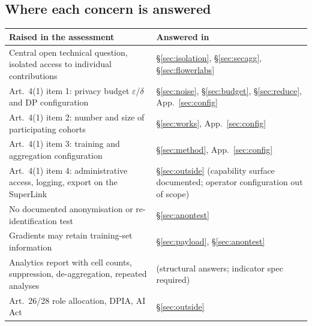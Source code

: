\subsection*{Where each concern is answered}

\begin{longtable}{p{}p{}}
\toprule
\textbf{Raised in the assessment} & \textbf{Answered in} \\
\midrule
\endhead
Central open technical question, isolated access to individual contributions
  & \S\ref{sec:isolation}, \S\ref{sec:secagg}, \S\ref{sec:flowerlabs} \\
Art.~4(1) item 1: privacy budget $\varepsilon$/$\delta$ and DP configuration
  & \S\ref{sec:noise}, \S\ref{sec:budget}, \S\ref{sec:reduce}, App.~\ref{sec:config} \\
Art.~4(1) item 2: number and size of participating cohorts
  & \S\ref{sec:works}, App.~\ref{sec:config} \\
Art.~4(1) item 3: training and aggregation configuration
  & \S\ref{sec:method}, App.~\ref{sec:config} \\
Art.~4(1) item 4: administrative access, logging, export on the SuperLink
  & \S\ref{sec:outside} (capability surface documented; operator configuration out of scope) \\
No documented anonymisation or re-identification test
  & \S\ref{sec:anontest} \\
Gradients may retain training-set information
  & \S\ref{sec:payload}, \S\ref{sec:anontest} \\
Analytics report with cell counts, suppression, de-aggregation, repeated analyses
  & (structural answers; indicator spec required) \\
Art.~26/28 role allocation, DPIA, AI Act
  & \S\ref{sec:outside} \\
\bottomrule
\end{longtable}
